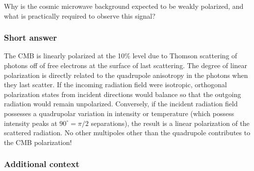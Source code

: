 \documentclass[a4paper,11pt]{article}
\begin{document}
Why is the cosmic microwave background expected to be weakly polarized, and what is practically required to observe this signal?

\subsubsection{Short answer}

The CMB is linearly polarized at the 10\% level due to Thomson scattering of photons off of free electrons at the surface of last scattering.  The degree of linear polarization is directly related to the quadrupole anisotropy in the photons when they last scatter. If the incoming radiation field were isotropic, orthogonal polarization states from incident directions would balance so that the outgoing radiation would remain unpolarized. Conversely, if the incident radiation field possesses a quadrupolar variation in intensity or temperature (which possess intensity peaks at $90^\circ=\pi/2$ separations), the result is a linear polarization of the scattered radiation. No other multipoles other than the quadrupole contributes to the CMB polarization!

\subsubsection{Additional context}
\end{document}
